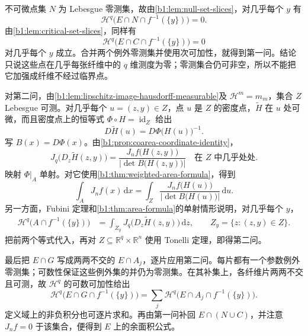 \begin{solution}
不可微点集 \(N\) 为 Lebesgue 零测集，故由\cref{b1:lem:null-set-slices}，对几乎每个 \(y\) 有
\[
 \mathcal H^q\bigl(E\cap N\cap f^{-1}(\{y\})\bigr)=0.
\]
由\cref{b1:lem:critical-set-slices}，同样有
\[
 \mathcal H^q\bigl(E\cap C\cap f^{-1}(\{y\})\bigr)=0
\]
对几乎每个 \(y\) 成立。合并两个例外零测集并使用次可加性，就得到第一问。结论只说这些点在几乎每张纤维中的 \(q\) 维测度为零；零测集合仍可非空，所以不能把它加强成纤维不经过临界点。

对第二问，由\cref{b1:lem:lipschitz-image-hausdorff-measurable}及 \(\mathcal H^m=m_m\)，集合 \(Z\) Lebesgue 可测。对几乎每个 \(u=(z,y)\in Z\)，点 \(u\) 是 \(Z\) 的密度点，\(\widetilde H\) 在 \(u\) 处可微，而且密度点上的恒等式 \(\Phi\circ H=\operatorname{id}_Z\) 给出
\[
 D\widetilde H(u)=D\Phi\bigl(H(u)\bigr)^{-1}.
\]
写 \(B(x)=D\Phi(x)\)。由\cref{b1:prop:coarea-coordinate-identity}，
\[
 J_q\bigl(D_z\widetilde H(z,y)\bigr)
 =\frac{J_nf\bigl(H(z,y)\bigr)}
 {\lvert\det B\bigl(H(z,y)\bigr)\rvert}
 \quad\text{在 }Z\text{ 中几乎处处}.
\]
映射 \(\Phi|_A\) 单射。对它使用\cref{b1:thm:weighted-area-formula}，得到
\[
 \int_AJ_nf(x)\,\mathrm dx
 =\int_Z
 \frac{J_nf\bigl(H(u)\bigr)}
 {\lvert\det B\bigl(H(u)\bigr)\rvert}\,\mathrm du.
\]
另一方面，Fubini 定理和\cref{b1:thm:area-formula}的单射情形说明，对几乎每个 \(y\)，
\[
 \begin{aligned}
 \mathcal H^q\bigl(A\cap f^{-1}(\{y\})\bigr)
 &=\int_{Z_y}J_q\bigl(D_z\widetilde H(z,y)\bigr)\,\mathrm dz,
 \qquad
 Z_y=\{z:(z,y)\in Z\}.
 \end{aligned}
\]
把前两个等式代入，再对 \(Z\subseteq\mathbb R^q\times\mathbb R^n\) 使用 Tonelli 定理，即得第二问。

最后把 \(E\cap G\) 写成两两不交的 \(E\cap A_j\)，逐片应用第二问。每片都有一个参数例外零测集；可数性保证这些例外集的并仍为零测集。在其补集上，各纤维片两两不交且可测，故 \(\mathcal H^q\) 的可数可加性给出
\[
 \mathcal H^q\bigl(E\cap G\cap f^{-1}(\{y\})\bigr)
 =\sum_j\mathcal H^q\bigl(E\cap A_j\cap f^{-1}(\{y\})\bigr).
\]
定义域上的非负积分也可逐片求和。再由第一问补回 \(E\cap(N\cup C)\)，并注意 \(J_nf=0\) 于该集合，便得到 \(E\) 上的余面积公式。
\end{solution}
